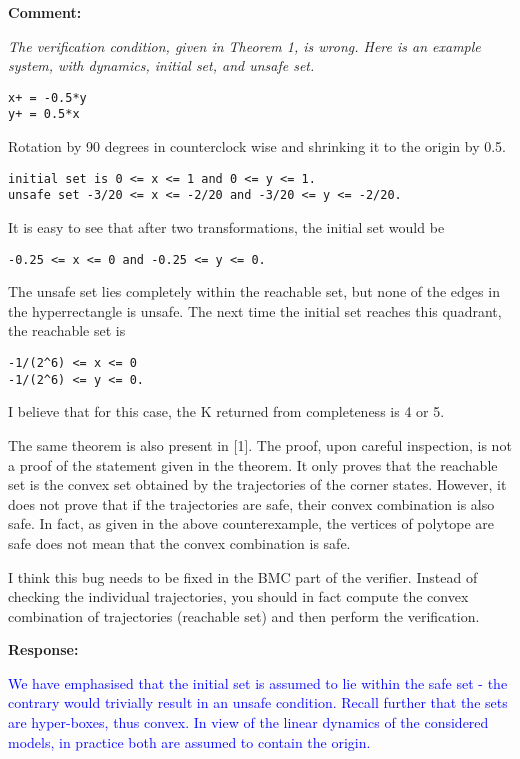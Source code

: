 \documentclass{article}
\newcommand{\rev}[1]{\textcolor{blue}{#1}}
\begin{document}
{\bf Comment: }{\itshape
The verification condition, given in Theorem 1, is wrong. Here is an example system, with dynamics, initial set, and unsafe set.

\begin{verbatim}
x+ = -0.5*y
y+ = 0.5*x
\end{verbatim}


Rotation by 90 degrees in counterclock wise and shrinking it to the origin by 0.5.
\begin{verbatim}
initial set is 0 <= x <= 1 and 0 <= y <= 1.
unsafe set -3/20 <= x <= -2/20 and -3/20 <= y <= -2/20.
\end{verbatim}

It is easy to see that after two transformations, the initial set would be
\begin{verbatim}
-0.25 <= x <= 0 and -0.25 <= y <= 0.
\end{verbatim}
The unsafe set lies completely within the reachable set, but none of the edges in the hyperrectangle is unsafe. The next time the initial set reaches
this quadrant, the reachable set is
\begin{verbatim}
-1/(2^6) <= x <= 0
-1/(2^6) <= y <= 0.
\end{verbatim}

I believe that for this case, the K returned from completeness is 4 or 5.

The same theorem is also present in [1]. The proof, upon careful inspection, is not a proof of the statement given in the theorem. It only proves
that the reachable set is the convex set obtained by the trajectories of the corner states. However, it does not prove that if the trajectories are
safe, their convex combination is also safe. In fact, as given in the above counterexample, the vertices of polytope are safe does not mean that the
convex combination is safe.

I think this bug needs to be fixed in the BMC part of the verifier. Instead of checking the individual trajectories, you should in fact compute the
convex combination of trajectories (reachable set) and then perform the verification.}

\vspace{1em}
{\bf Response: }
\vspace{2em}

\rev{We have emphasised that the initial set is assumed to lie within the safe set - the contrary would trivially result in an unsafe condition. 
Recall further that the sets are hyper-boxes, thus convex. In view of the linear dynamics of the considered models, in practice both are assumed to contain the origin.  }
\end{document}
